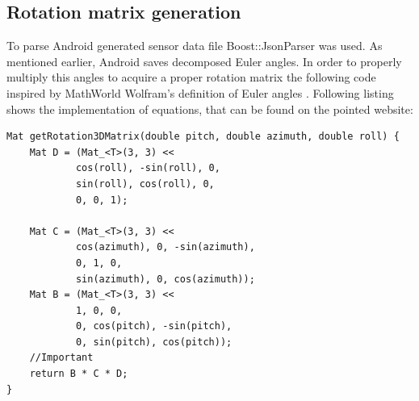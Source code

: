 \subsection{Rotation matrix generation} \label{sec:rot_gen}
To parse Android generated sensor data file Boost::JsonParser was used. As mentioned earlier, Android saves decomposed Euler angles. In order to properly multiply this angles to acquire a proper rotation matrix the following code inspired by MathWorld Wolfram's definition of Euler angles \cite{website:eulerAngles}. Following listing shows the implementation of equations, that can be found on the pointed website:
\begin{lstlisting}
Mat getRotation3DMatrix(double pitch, double azimuth, double roll) {
    Mat D = (Mat_<T>(3, 3) <<
            cos(roll), -sin(roll), 0,
            sin(roll), cos(roll), 0,
            0, 0, 1);

    Mat C = (Mat_<T>(3, 3) <<
            cos(azimuth), 0, -sin(azimuth),
            0, 1, 0,
            sin(azimuth), 0, cos(azimuth));
    Mat B = (Mat_<T>(3, 3) <<
            1, 0, 0,
            0, cos(pitch), -sin(pitch),
            0, sin(pitch), cos(pitch));
    //Important
    return B * C * D;
}
\end{lstlisting}




